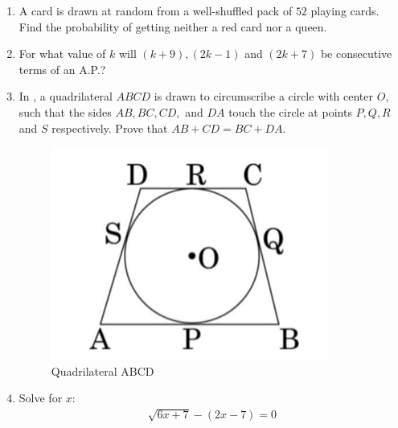\documentclass{article}
\begin{document}
\begin{enumerate}
    \item A card is drawn at random from a well-shuffled pack of $52$ playing cards. Find the probability of getting neither a red card nor a queen.
    
    \item For what value of $k$ will $(k+9), (2k-1)$ and $( 2k+7)$ be consecutive terms of an A.P.?
    
    \item In , a quadrilateral $ABCD$ is drawn to circumscribe a circle with center $O$, such that the sides $AB, BC, CD,$ and $DA$ touch the circle at points $P, Q, R$ and $S$ respectively. Prove that $AB + CD = BC + DA$.
    \begin{figure}[H]
	\includegraphics[width=\columnwidth]{./quadrilateralABCD.jpg}
        \caption{Quadrilateral ABCD}
        \label{fig:quadrilateralABCD}
    \end{figure}

    \item Solve for $x$:
    \begin{align}
        \sqrt{6x + 7} - (2x - 7) = 0
    \end{align}


\end{enumerate}
\end{document}
